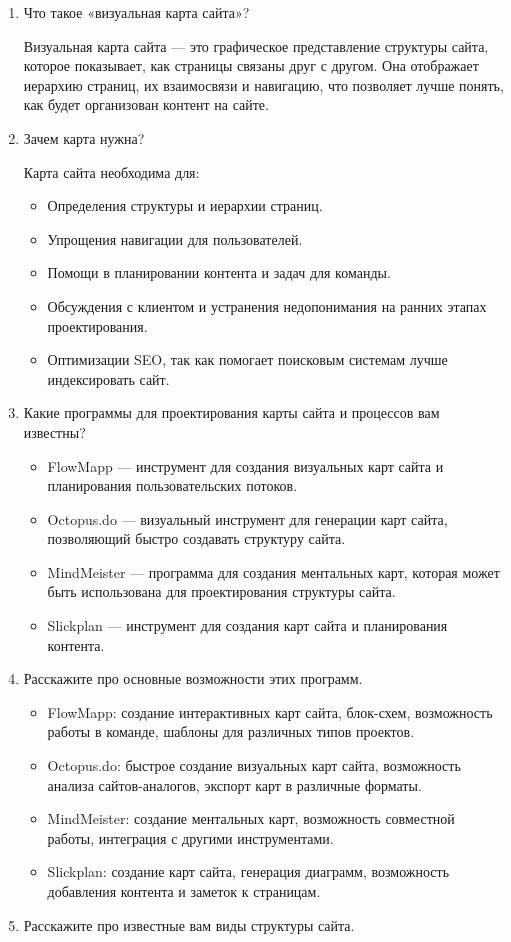 \begin{enumerate}
    \item Что такое «визуальная карта сайта»?

Визуальная карта сайта — это графическое представление структуры сайта, которое показывает, как страницы связаны друг с другом. Она отображает иерархию страниц, их взаимосвязи и навигацию, что позволяет лучше понять, как будет организован контент на сайте.
    \item Зачем карта нужна?

Карта сайта необходима для:
        \begin{itemize}
            \item Определения структуры и иерархии страниц.
            \item Упрощения навигации для пользователей.
            \item Помощи в планировании контента и задач для команды.
            \item Обсуждения с клиентом и устранения недопонимания на ранних этапах проектирования.
            \item Оптимизации SEO, так как помогает поисковым системам лучше индексировать сайт.
        \end{itemize}
    \item Какие программы для проектирования карты сайта и процессов вам известны?

        \begin{itemize}
            \item FlowMapp — инструмент для создания визуальных карт сайта и планирования пользовательских потоков.
            \item Octopus.do — визуальный инструмент для генерации карт сайта, позволяющий быстро создавать структуру сайта.
            \item MindMeister — программа для создания ментальных карт, которая может быть использована для проектирования структуры сайта.
            \item Slickplan — инструмент для создания карт сайта и планирования контента.
        \end{itemize}
    \item Расскажите про основные возможности этих программ.

        \begin{itemize}
            \item FlowMapp: создание интерактивных карт сайта, блок-схем, возможность работы в команде, шаблоны для различных типов проектов.
            \item Octopus.do: быстрое создание визуальных карт сайта, возможность анализа сайтов-аналогов, экспорт карт в различные форматы.
            \item MindMeister: создание ментальных карт, возможность совместной работы, интеграция с другими инструментами.
            \item Slickplan: создание карт сайта, генерация диаграмм, возможность добавления контента и заметок к страницам.
        \end{itemize}
    \item Расскажите про известные вам виды структуры сайта.


\end{enumerate}
